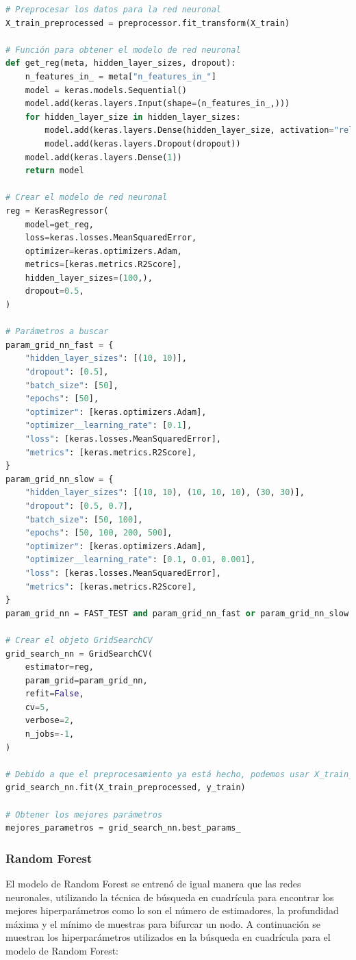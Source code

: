 \begin{lstlisting}[language=python, caption={Entrenamiento de redes neuronales}, label={lst:entrenamiento-redes-neuronales}]
# Preprocesar los datos para la red neuronal
X_train_preprocessed = preprocessor.fit_transform(X_train)

# Función para obtener el modelo de red neuronal
def get_reg(meta, hidden_layer_sizes, dropout):
    n_features_in_ = meta["n_features_in_"]
    model = keras.models.Sequential()
    model.add(keras.layers.Input(shape=(n_features_in_,)))
    for hidden_layer_size in hidden_layer_sizes:
        model.add(keras.layers.Dense(hidden_layer_size, activation="relu"))
        model.add(keras.layers.Dropout(dropout))
    model.add(keras.layers.Dense(1))
    return model

# Crear el modelo de red neuronal
reg = KerasRegressor(
    model=get_reg,
    loss=keras.losses.MeanSquaredError,
    optimizer=keras.optimizers.Adam,
    metrics=[keras.metrics.R2Score],
    hidden_layer_sizes=(100,),
    dropout=0.5,
)

# Parámetros a buscar
param_grid_nn_fast = {
    "hidden_layer_sizes": [(10, 10)],
    "dropout": [0.5],
    "batch_size": [50],
    "epochs": [50],
    "optimizer": [keras.optimizers.Adam],
    "optimizer__learning_rate": [0.1],
    "loss": [keras.losses.MeanSquaredError],
    "metrics": [keras.metrics.R2Score],
}
param_grid_nn_slow = {
    "hidden_layer_sizes": [(10, 10), (10, 10, 10), (30, 30)],
    "dropout": [0.5, 0.7],
    "batch_size": [50, 100],
    "epochs": [50, 100, 200, 500],
    "optimizer": [keras.optimizers.Adam],
    "optimizer__learning_rate": [0.1, 0.01, 0.001],
    "loss": [keras.losses.MeanSquaredError],
    "metrics": [keras.metrics.R2Score],
}
param_grid_nn = FAST_TEST and param_grid_nn_fast or param_grid_nn_slow

# Crear el objeto GridSearchCV
grid_search_nn = GridSearchCV(
    estimator=reg,
    param_grid=param_grid_nn,
    refit=False,
    cv=5,
    verbose=2,
    n_jobs=-1,
)

# Debido a que el preprocesamiento ya está hecho, podemos usar X_train_preprocessed directamente aquí
grid_search_nn.fit(X_train_preprocessed, y_train)

# Obtener los mejores parámetros
mejores_parametros = grid_search_nn.best_params_
\end{lstlisting}

\subsubsection{Random Forest}
El modelo de Random Forest se entrenó de igual manera que las redes neuronales,
utilizando la técnica de búsqueda en cuadrícula para encontrar los mejores hiperparámetros
como lo son el número de estimadores, la profundidad máxima y el mínimo de muestras
para bifurcar un nodo. A continuación se muestran los hiperparámetros utilizados
en la búsqueda en cuadrícula para el modelo de Random Forest:

